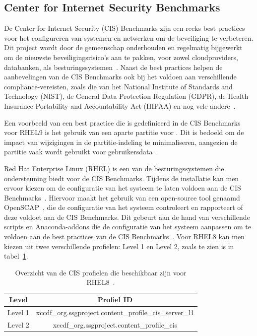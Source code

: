 \subsection{Center for Internet Security Benchmarks}%
\label{sub:cis-benchmarks}

De Center for Internet Security (CIS) Benchmarks zijn een reeks best practices voor het configureren van systemen en netwerken om de beveiliging te verbeteren.
Dit project wordt door de gemeenschap onderhouden en regelmatig bijgewerkt om de nieuwste beveiligingsrisico's aan te pakken, voor zowel cloudproviders, databanken, als besturingssystemen~\autocite{cis-benchmarks}.
Naast de best practices helpen de aanbevelingen van de CIS Benchmarks ook bij het voldoen aan verschillende compliance-vereisten, zoals die van het National Institute of Standards and Technology (NIST), de General Data Protection Regulation (GDPR), de Health Insurance Portability and Accountability Act (HIPAA) en nog vele andere~\autocite{cis-benchmarks-compliancy}.

Een voorbeeld van een best practice die is gedefinieerd in de CIS Benchmarks voor RHEL9 is het gebruik van een aparte partitie voor .
Dit is bedoeld om de impact van wijzigingen in de partitie-indeling te minimaliseren, aangezien de  partitie vaak wordt gebruikt voor gebruikersdata~\autocite{cis-benchmarks-rhel9}.

Red Hat Enterprise Linux (RHEL) is een van de besturingssystemen die ondersteuning biedt voor de CIS Benchmarks.
Tijdens de installatie kan men ervoor kiezen om de configuratie van het systeem te laten voldoen aan de CIS Benchmarks~\autocite{rhel-cis-benchmarks}.
Hiervoor maakt het gebruik van een open-source tool genaamd OpenSCAP~\autocite{open-scap}, die de configuratie van het systeem controleert en rapporteert of deze voldoet aan de CIS Benchmarks.
Dit gebeurt aan de hand van verschillende scripts en Anaconda-addons die de configuratie van het systeem aanpassen om te voldoen aan de best practices van de CIS Benchmarks~\autocite{open-scap-anaconda}.
Voor RHEL8 kan men kiezen uit twee verschillende profielen: Level 1 en Level 2, zoals te zien is in tabel~\ref{tab:rhel-cis-benchmarks}.

\begin{table}[!h]
    \begin{center}
        \begin{tabular}{ c c  }
            \hline
                Level & Profiel ID \\ [0.5ex]
            \hline
              Level 1 & xccdf\_org.ssgproject.content\_profile\_cis\_server\_l1 \\
              Level 2 & xccdf\_org.ssgproject.content\_profile\_cis \\
        \end{tabular}
    \end{center}
    \caption[Overzicht van RHEL8 CIS profielen]{Overzicht van de CIS profielen die beschikbaar zijn voor RHEL8~\autocite{rhel-cis-benchmarks}.}
    \label{tab:rhel-cis-benchmarks}
\end{table}

